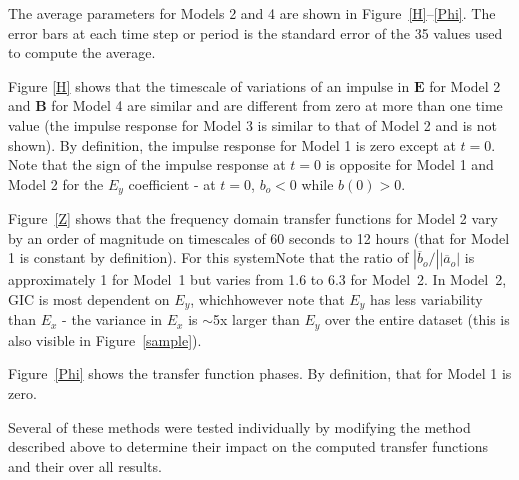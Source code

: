 \documentclass[draft,linenumbers]{agujournal2018}
\begin{document}
The average parameters for Models 2 and 4 are shown in Figure~\ref{H}--\ref{Phi}. The error bars at each time step or period is the standard error of the 35 values used to compute the average. 

Figure \ref{H} shows that the timescale of variations of an impulse in $\mathbf{E}$ for Model 2 and $\mathbf{B}$ for Model 4 are similar and are different from zero at more than one time value (the impulse response for Model 3 is similar to that of Model 2 and is not shown). By definition, the impulse response for Model 1 is zero except at $t=0$. Note that the sign of the impulse response at $t=0$ is opposite for Model 1 and Model 2 for the $E_y$ coefficient - at $t=0$, $b_o < 0$ while $b(0)>0$.

Figure~\ref{Z} shows that the frequency domain transfer functions for Model 2 vary by an order of magnitude on timescales of 60 seconds to 12 hours (that for Model 1 is constant by definition). For this systemNote that the ratio of $|\overline{b}_o/||\overline{a}_o|$ is approximately 1 for Model~1 but varies from 1.6 to 6.3 for Model~2. In Model~2, GIC is most dependent on $E_y$, whichhowever note that $E_y$ has less variability than $E_x$ - the variance in $E_x$ is $\sim$5x larger than $E_y$ over the entire dataset (this is also visible in Figure~\ref{sample}). 

Figure~\ref{Phi} shows the transfer function phases. By definition, that for Model 1 is zero.

Several of these methods were tested individually by modifying the method described above to determine their impact on the computed transfer functions and their over all results. 
\end{document}
